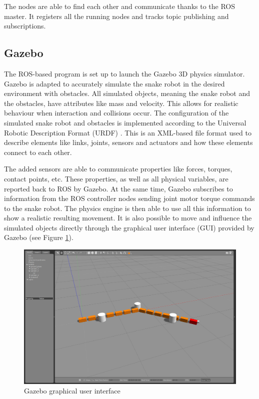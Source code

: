The nodes are able to find each other and communicate thanks to the ROS master. It registers all the 
running nodes and tracks topic publishing and subscriptions.

\subsection{Gazebo}

The ROS-based program is set up to launch the Gazebo 3D physics simulator. Gazebo is adapted to accurately simulate the snake robot in the desired environment with obstacles. All simulated objects, meaning the snake robot and the obstacles, have attributes like mass and velocity. This allows for realistic behaviour when interaction and collisions occur. The configuration of the simulated snake robot and obstacles is implemented according to the Universal Robotic Description Format (URDF) \cite{urdfWeb}. This is an XML-based file format used to describe elements like links, joints, sensors and actuators and how these elements connect to each other.

The added sensors are able to communicate properties like forces, torques, contact points, etc. These properties, as well as all physical variables, are reported back to ROS by Gazebo.
At the same time, Gazebo subscribes to information from the ROS controller nodes sending joint motor torque commands to the snake robot. The physics engine is then able to use all this information to show a realistic resulting movement. It is also possible to move and influence the simulated objects directly through the graphical user interface (GUI) provided by Gazebo (see Figure \ref{fig:gazebo_gui}).

\begin{figure}
    \centering
    \includegraphics[width=1\textwidth]{figures/simulator/gazebo_gen_screen.png}
    \caption{Gazebo graphical user interface}
    \label{fig:gazebo_gui}
\end{figure}